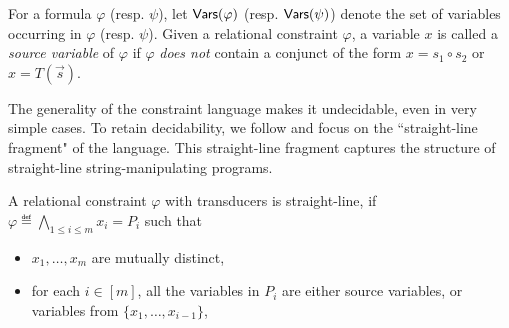 \documentclass{llncs}
\newcommand{\mat}[1]{\color{cyan} {MH: #1 :HM} \color{black}}
\newcommand{\mat}[1]{}
\newcommand{\concat} {\circ}
\begin{document}
For a formula $\varphi$ (resp. $\psi$), let $\mathsf{Vars}(\varphi)$ (resp. $\mathsf{Vars}(\psi)$) denote the set of variables occurring in $\varphi$ (resp. $\psi$). Given a relational constraint $\varphi$, a variable $x$ is called a \emph{source variable} of $\varphi$ if $\varphi$ \emph{does not} contain a conjunct of the form $x = s_1 \concat s_2$ or $x = T(\vec{s})$.







The generality of the constraint language makes it undecidable,
even in very simple cases. To retain decidability, we follow \cite{LB16} and focus on the ``straight-line fragment" of the language. This straight-line fragment captures the structure of straight-line string-manipulating
programs.

\begin{definition}
	A relational constraint $ \varphi$ with transducers is straight-line, if $\varphi \eqdef \bigwedge \limits_{1 \le i \le m} x_i = P_i$ such that
	\begin{itemize}
		\item $x_1,\dots, x_m$ are mutually distinct,
		\item for each $i \in [m]$, all the variables in $P_i$ are either source variables, or variables from $\{x_1,\dots, x_{i-1}\}$,
	\end{itemize}
\end{definition}
\end{document}
